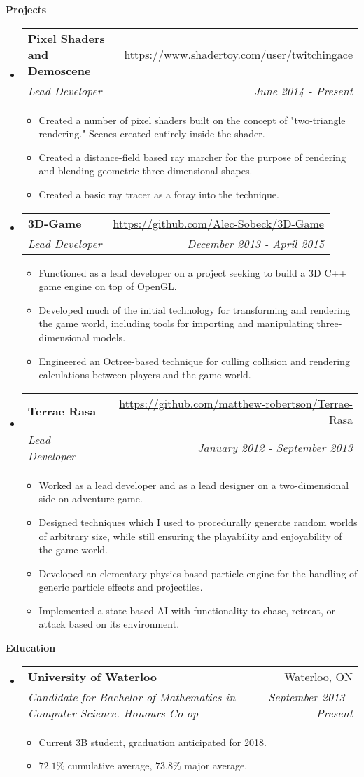 \documentclass[letterpaper,11pt]{article}
\makeatletter
\newcommand{\resitem}[1]{\item #1 \vspace{-2pt}}
\newcommand{\resheading}[1]{{\large \colorbox{mygrey}{\begin{minipage}{\textwidth}{\textbf{#1 \vphantom{p\^{E}}}}\end{minipage}}}}
\newcommand{\ressubheading}[4]{
\begin{tabular*}{7.0in}{l@{\extracolsep{\fill}}r}
		\textbf{#1} & #2 \\
		\textit{#3} & \textit{#4} \\
\end{tabular*}\vspace{-6pt}}
\makeatother
\begin{document}
\resheading{Projects}
\begin{itemize}
\item
	\ressubheading{Pixel Shaders and Demoscene}{\url{https://www.shadertoy.com/user/twitchingace}}{Lead Developer}{June 2014 - Present}
	\begin{itemize}
		\resitem{Created a number of pixel shaders built on the concept of "two-triangle rendering." Scenes created entirely inside the shader.}
		\resitem{Created a distance-field based ray marcher for the purpose of rendering and blending geometric three-dimensional shapes.}
		\resitem{Created a basic ray tracer as a foray into the technique.}
	\end{itemize}
\item
	\ressubheading{3D-Game}{\url{https://github.com/Alec-Sobeck/3D-Game}}{Lead Developer}{December 2013 - April 2015}
	\begin{itemize}
		\resitem{Functioned as a lead developer on a project seeking to build a 3D C++ game engine on top of OpenGL.}
		\resitem{Developed much of the initial technology for transforming and rendering the game world, including tools for importing and manipulating three-dimensional models.}
		\resitem{Engineered an Octree-based technique for culling collision and rendering calculations between players and the game world.}
	\end{itemize}
\newpage
\item
	\ressubheading{Terrae Rasa}{\url{https://github.com/matthew-robertson/Terrae-Rasa}}{Lead Developer}{January 2012 - September 2013}
	\begin{itemize}
		\resitem{Worked as a lead developer and as a lead designer on a two-dimensional side-on adventure game.}
		\resitem{Designed techniques which I used to procedurally generate random worlds of arbitrary size, while still ensuring the playability and enjoyability of the game world.}
		\resitem{Developed an elementary physics-based particle engine for the handling of generic particle effects and projectiles.}
		\resitem{Implemented a state-based AI with functionality to chase, retreat, or attack based on its environment.}
	\end{itemize}
\end{itemize}

\resheading{Education}
\begin{itemize}
\item
	\ressubheading{University of Waterloo}{Waterloo, ON}{Candidate for Bachelor of Mathematics in Computer Science. Honours Co-op}{September 2013 - Present}
	\begin{itemize}
		\resitem{Current 3B student, graduation anticipated for 2018.}
		\resitem{$72.1\%$ cumulative average, $73.8\%$ major average.}	
	\end{itemize}

\end{itemize}
\end{document}
